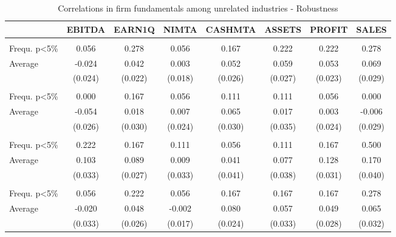 \begin{table}

\caption{\label{tab:table-oa6}Correlations in firm fundamentals among unrelated industries - Robustness}
\centering
\begin{tabular}[t]{lccccccc}
\toprule
  & EBITDA & EARN1Q & NIMTA & CASHMTA & ASSETS & PROFIT & SALES\\
\midrule
\addlinespace[0.3em]
\multicolumn{8}{l}{\textbf{Full Sample}}\\
\hspace{1em}Frequ. p<5\% & 0.056 & 0.278 & 0.056 & 0.167 & 0.222 & 0.222 & 0.278\\
\hspace{1em}Average & -0.024 & 0.042 & 0.003 & 0.052 & 0.059 & 0.053 & 0.069\\
\hspace{1em} & (0.024) & (0.022) & (0.018) & (0.026) & (0.027) & (0.023) & (0.029)\\
\addlinespace[0.3em]
\multicolumn{8}{l}{\textbf{Pre-GFC}}\\
\hspace{1em}Frequ. p<5\% & 0.000 & 0.167 & 0.056 & 0.111 & 0.111 & 0.056 & 0.000\\
\hspace{1em}Average & -0.054 & 0.018 & 0.007 & 0.065 & 0.017 & 0.003 & -0.006\\
\hspace{1em} & (0.026) & (0.030) & (0.024) & (0.030) & (0.035) & (0.024) & (0.029)\\
\addlinespace[0.3em]
\multicolumn{8}{l}{\textbf{Post-GFC}}\\
\hspace{1em}Frequ. p<5\% & 0.222 & 0.167 & 0.111 & 0.056 & 0.111 & 0.167 & 0.500\\
\hspace{1em}Average & 0.103 & 0.089 & 0.009 & 0.041 & 0.077 & 0.128 & 0.170\\
\hspace{1em} & (0.033) & (0.027) & (0.033) & (0.041) & (0.038) & (0.031) & (0.040)\\
\addlinespace[0.3em]
\multicolumn{8}{l}{\textbf{Ex-Recessions}}\\
\hspace{1em}Frequ. p<5\% & 0.056 & 0.222 & 0.056 & 0.167 & 0.167 & 0.167 & 0.278\\
\hspace{1em}Average & -0.020 & 0.048 & -0.002 & 0.080 & 0.057 & 0.049 & 0.065\\
\hspace{1em} & (0.033) & (0.026) & (0.017) & (0.024) & (0.033) & (0.028) & (0.032)\\

\end{tabular}
\end{table}
